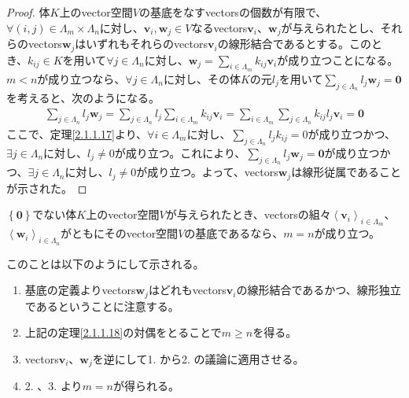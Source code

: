 \documentclass[dvipdfmx]{jsarticle}
\begin{document}
\begin{proof}
体$K$上のvector空間$V$の基底をなすvectorsの個数が有限で、$\forall(i,j) \in \varLambda_{m} \times \varLambda_{n}$に対し、$\mathbf{v}_{i},\mathbf{w}_{j} \in V$なるvectors$\mathbf{v}_{i}$、$\mathbf{w}_{j}$が与えられたとし、それらのvectors$\mathbf{w}_{j}$はいずれもそれらのvectors$\mathbf{v}_{i}$の線形結合であるとする。このとき、$k_{ij} \in K$を用いて$\forall j \in \varLambda_{n}$に対し、$\mathbf{w}_{j} = \sum_{i \in \varLambda_{m}} {k_{ij}\mathbf{v}_{i}}$が成り立つことになる。$m < n$が成り立つなら、$\forall j \in \varLambda_{n}$に対し、その体$K$の元$l_{j}$を用いて$\sum_{j \in \varLambda_{n}} {l_{j}\mathbf{w}_{j}} = \mathbf{0}$を考えると、次のようになる。
\begin{align*}
\sum_{j \in \varLambda_{n}} {l_{j}\mathbf{w}_{j}} = \sum_{j \in \varLambda_{n}} {l_{j}\sum_{i \in \varLambda_{m}} {k_{ij}\mathbf{v}_{i}}} = \sum_{i \in \varLambda_{m}} {\sum_{j \in \varLambda_{n}} {k_{ij}l_{j}}\mathbf{v}_{i}} = \mathbf{0}
\end{align*}
ここで、定理\ref{2.1.1.17}より、$\forall i \in \varLambda_{m}$に対し、$\sum_{j \in \varLambda_{n}} {l_{j}k_{ij}}=0$が成り立つかつ、$\exists j \in \varLambda_{n}$に対し、$l_{j} \neq 0$が成り立つ。これにより、$\sum_{j \in \varLambda_{n}} {l_{j}\mathbf{w}_{j}} = \mathbf{0}$が成り立つかつ、$\exists j \in \varLambda_{n}$に対し、$l_{j} \neq 0$が成り立つ。よって、vectors$\mathbf{w}_{j}$は線形従属であることが示された。
\end{proof}
\begin{thm}[有限次元の一意性]\label{2.1.1.19}
$\left\{ \mathbf{0} \right\}$でない体$K$上のvector空間$V$が与えられたとき、vectorsの組々$\left\langle \mathbf{v}_{i} \right\rangle_{i \in \varLambda_{m}}$、$\left\langle \mathbf{w}_{i} \right\rangle_{i \in \varLambda_{n}}$がともにそのvector空間$V$の基底であるなら、$m = n$が成り立つ。\par
このことは以下のようにして示される。
\begin{enumerate}
\item
  基底の定義よりvectors$\mathbf{w}_{j}$はどれもvectors$\mathbf{v}_{i}$の線形結合であるかつ、線形独立であるということに注意する。
\item
  上記の定理\ref{2.1.1.18}の対偶をとることで$m \geq n$を得る。
\item
  vectors$\mathbf{v}_{i}、\mathbf{w}_{j}$を逆にして1. から2. の議論に適用させる。
\item
  2. 、3. より$m = n$が得られる。
\end{enumerate}
\end{thm}
\end{document}
